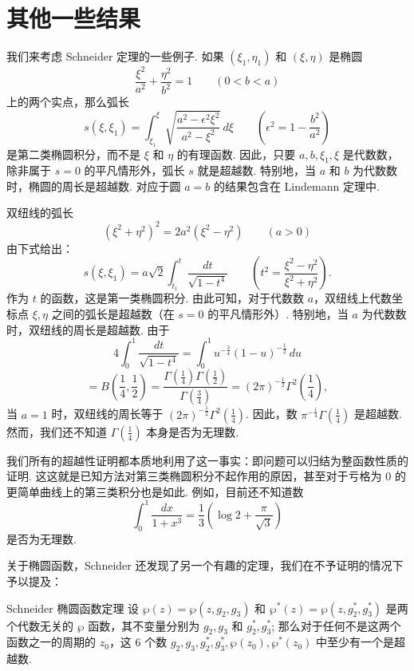 \section{其他一些结果}\label{sec:4.5}

我们来考虑 Schneider 定理的一些例子. 如果 $(\xi_1, \eta_1)$ 和 $(\xi, \eta)$ 是椭圆
\[
\frac{\xi^2}{a^2} + \frac{\eta^2}{b^2} = 1 \qquad (0 < b < a)
\]
上的两个实点，那么弧长
\[
s(\xi, \xi_1) = \int_{\xi_1}^{\xi} \sqrt{\frac{a^2 - \epsilon^2 \xi^2}{a^2 - \xi^2}} \, d\xi \qquad \left(\epsilon^2 = 1 - \frac{b^2}{a^2}\right)
\]
是第二类椭圆积分，而不是 $\xi$ 和 $\eta$ 的有理函数. 因此，只要 $a, b, \xi_1, \xi$ 是代数数，除非属于 $s=0$ 的平凡情形外，弧长 $s$ 就是超越数. 特别地，当 $a$ 和 $b$ 为代数数时，椭圆的周长是超越数. 对应于圆 $a=b$ 的结果包含在 Lindemann 定理中.

双纽线的弧长
\[
(\xi^2 + \eta^2)^2 = 2a^2(\xi^2 - \eta^2) \qquad (a > 0)
\]
由下式给出：
\[
s(\xi, \xi_1) = a\sqrt{2} \int_{t_1}^{t} \frac{dt}{\sqrt{1-t^4}} \qquad \left(t^2 = \frac{\xi^2 - \eta^2}{\xi^2 + \eta^2}\right).
\]
作为 $t$ 的函数，这是第一类椭圆积分. 由此可知，对于代数数 $a$，双纽线上代数坐标点 $\xi, \eta$ 之间的弧长是超越数（在 $s=0$ 的平凡情形外）. 特别地，当 $a$ 为代数数时，双纽线的周长是超越数. 由于
\[
4 \int_{0}^{1} \frac{dt}{\sqrt{1-t^{4}}} = \int_{0}^{1} u^{-\frac{3}{4}} (1-u)^{-\frac{1}{2}} \, du
\]
\[
= B \left(\frac{1}{4}, \frac{1}{2}\right) = \frac{\Gamma \left(\frac{1}{4}\right) \Gamma \left(\frac{1}{2}\right)}{\Gamma \left(\frac{3}{4}\right)} = (2 \pi)^{-\frac{1}{2}} \Gamma^{2} \left(\frac{1}{4}\right),
\]
当 $a=1$ 时，双纽线的周长等于 $(2\pi)^{-\frac{1}{2}} \Gamma^2(\frac{1}{4})$. 因此，数 $\pi^{-\frac{1}{4}} \Gamma(\frac{1}{4})$ 是超越数. 然而，我们还不知道 $\Gamma(\frac{1}{4})$ 本身是否为无理数.

我们所有的超越性证明都本质地利用了这一事实：即问题可以归结为整函数性质的证明. 这这就是已知方法对第三类椭圆积分不起作用的原因，甚至对于亏格为 $0$ 的更简单曲线上的第三类积分也是如此. 例如，目前还不知道数
\[
\int_0^1 \frac{dx}{1+x^3} = \frac{1}{3} \left(\log 2 + \frac{\pi}{\sqrt{3}}\right)
\]
是否为无理数.

关于椭圆函数，Schneider 还发现了另一个有趣的定理，我们在不予证明的情况下予以提及：

\begin{mythm*}{Schneider 椭圆函数定理}
设 $\wp(z) = \wp(z, g_2, g_3)$ 和 $\wp^*(z) = \wp(z, g_2^*, g_3^*)$ 是两个代数无关的 $\wp$ 函数，其不变量分别为 $g_2, g_3$ 和 $g_2^*, g_3^*$; 那么对于任何不是这两个函数之一的周期的 $z_0$，这 6 个数 $g_2, g_3, g_2^*, g_3^*, \wp(z_0), \wp^*(z_0)$ 中至少有一个是超越数.
\end{mythm*}

